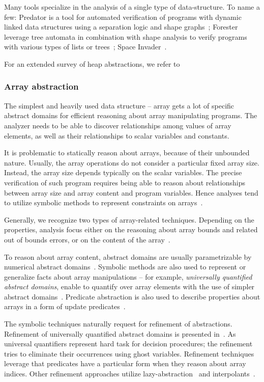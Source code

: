 Many tools specialize in the analysis of a single type of data-structure. To name a few: Predator is a tool for automated verification of programs with dynamic linked data structures using a separation logic and shape graphs~\cite{Dudka2012}; Forester leverage tree automata in combination with shape analysis to verify programs with various types of lists or trees~\cite{Holik2015}; Space Invader~\cite{Yang2008}.


For an extended survey of heap abstractions, we refer to~\cite{Kanvar2016}

\subsubsection{Array abstraction}

The simplest and heavily used data structure -- array gets a lot of specific
abstract domains for efficient reasoning about array manipulating programs. The
analyzer needs to be able to discover relationships among values of array
elements, as well as their relationships to scalar variables and constants.

It is problematic to statically reason about arrays, because of their unbounded
nature.  Usually, the array operations do not consider a particular fixed array
size. Instead, the array size depends typically on the scalar variables. The
precise verification of such program requires being able to reason about
relationships between array size and array content and program variables. Hence
analyses tend to utilize symbolic methods to represent constraints on
arrays~\cite{Gopan2005}.

Generally, we recognize two types of array-related techniques. Depending on the
properties, analysis focus either on the reasoning about array bounds and
related out of bounds errors, or on the content of the array~\cite{Halbwachs2008}.

To reason about array content, abstract domains are usually parametrizable by
numerical abstract domains~\cite{Cousot2011p}. Symbolic methods are also used
to represent or generalize facts about array manipulations -- for example,
\emph{universally quantified abstract domains}, enable to quantify over array
elements with the use of simpler abstract domains~\cite{Gulwani2008}.
Predicate abstraction is also used to describe properties about arrays in a
form of update predicates~\cite{Kovacs2009}.

The symbolic techniques naturally request for refinement of abstractions.
Refinement of universally quantified abstract domains is presented in~\cite{Seghir2009}.
As universal quantifiers represent hard task for decision procedures; the
refinement tries to eliminate their occurrences using ghost variables.
Refinement techniques leverage that predicates have a particular form when they
reason about array indices. Other refinement approaches utilize lazy-abstraction~\cite{Alberti2012} and interpolants~\cite{Alberti2012b}.

